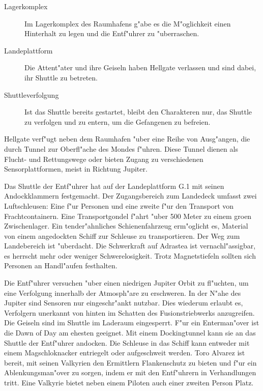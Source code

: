 \begin{description}
	\item [Lagerkomplex] Im Lagerkomplex des Raumhafens g"abe es die M"oglichkeit einen Hinterhalt zu legen und die Entf"uhrer zu 		
		"uberraschen.
	\item [Landeplattform] Die Attent"ater und ihre Geiseln haben Hellgate verlassen und sind dabei, ihr Shuttle zu betreten.
	\item [Shuttleverfolgung] Ist das Shuttle bereits gestartet, bleibt den Charakteren nur, das Shuttle zu verfolgen und zu entern, um die 	
		Gefangenen zu befreien.
\end{description}



Hellgate verf"ugt neben dem Raumhafen "uber eine Reihe von Ausg"angen, die durch Tunnel zur Oberfl"ache des Mondes f"uhren. Diese Tunnel dienen als Flucht- und Rettungswege oder bieten Zugang zu verschiedenen Sensorplattformen, meist in Richtung Jupiter.

Das Shuttle der Entf"uhrer hat auf der Landeplattform G.1 mit seinen Andockklammern festgemacht. Der Zugangsbereich zum Landedeck umfasst zwei Luftschleusen: Eine f"ur Personen und eine zweite f"ur den Transport von Frachtcontainern. Eine Transportgondel f"ahrt "uber 500 Meter zu einem gro\3en Zwischenlager. Ein tender"ahnliches Schienenfahrzeug erm"oglicht es, Material von einem angedockten Schiff zur Schleuse zu transportieren. Der Weg zum Landebereich ist "uberdacht. Die Schwerkraft auf Adrastea ist vernachl"assigbar, es herrscht mehr oder weniger Schwerelosigkeit. Trotz Magnetstiefeln sollten sich Personen an Handl"aufen festhalten.


Die Entf"uhrer versuchen "uber einen niedrigen Jupiter Orbit zu fl"uchten, um eine Verfolgung innerhalb der Atmosph"are zu erschweren. In der N"ahe des Jupiter sind Sensoren nur eingeschr"ankt nutzbar. Dies wiederum erlaubt es, Verfolgern unerkannt von hinten im Schatten des Fusionstriebwerks anzugreifen. Die Geiseln sind im Shuttle im Laderaum eingesperrt. F"ur ein Enterman"over ist die Dawn of Day am ehesten geeignet. Mit einem Dockingtunnel kann sie an das Shuttle der Entf"uhrer andocken. Die Schleuse in das Schiff kann entweder mit einem Magschlo\3knacker entriegelt oder aufgeschwei\3t werden. Toro Alvarez ist bereit, mit seinen Valkyrien den Ermittlern Flankenschutz zu bieten und f"ur ein Ablenkungsman"over zu sorgen, indem er mit den Entf"uhrern in Verhandlungen tritt. Eine Valkyrie bietet neben einem Piloten auch einer zweiten Person Platz.

